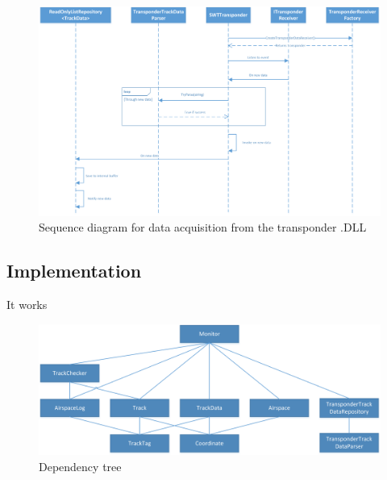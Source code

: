 \begin{figure}
	\centering
	\includegraphics[width=1.0\linewidth]{Images/SWTTransponder}
	\caption{Sequence diagram for data acquisition from the transponder .DLL}
	\label{fig:SWTTransponderSeq}
\end{figure}

\subsection{Implementation}

It works

\begin{figure}
	\centering
	\includegraphics[width=1.0\linewidth]{"Images/Dependency tree"}
	\caption{Dependency tree}
	\label{fig:Dependencytree}
\end{figure}

\clearpage
